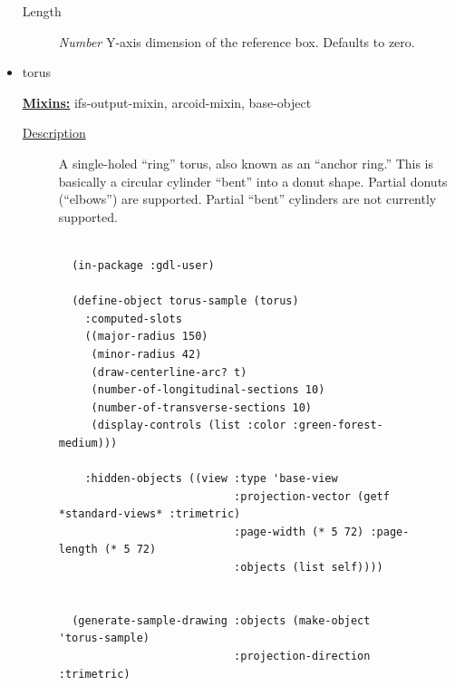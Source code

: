 \documentclass [11pt]{book}
\begin{document}
\begin{itemize}
\begin{description}

\item [Length]
\emph{Number} Y-axis dimension of the reference box. Defaults to zero.


\end{description}







\item {}torus


\textbf{
\underline{Mixins:}} ifs-output-mixin, arcoid-mixin, base-object





\begin{description}

\item [
\underline{Description}]


A single-holed ``ring'' torus, also known as an ``anchor ring.''
This is basically a circular cylinder ``bent'' into a donut shape. Partial donuts (``elbows'') are supported.
Partial ``bent'' cylinders are not currently supported.



\end{description}




\begin{figure}
\begin{lrbox}{\boxedverb}
\begin{minipage}{\linewidth}
{\small

\begin{verbatim}
  
  (in-package :gdl-user)
  
  (define-object torus-sample (torus)
    :computed-slots
    ((major-radius 150)
     (minor-radius 42)
     (draw-centerline-arc? t)
     (number-of-longitudinal-sections 10)
     (number-of-transverse-sections 10)
     (display-controls (list :color :green-forest-medium)))

    :hidden-objects ((view :type 'base-view
                           :projection-vector (getf *standard-views* :trimetric)
                           :page-width (* 5 72) :page-length (* 5 72)
                           :objects (list self))))
  

  (generate-sample-drawing :objects (make-object 'torus-sample) 
                           :projection-direction :trimetric)
                  


\end{verbatim}}
\end{minipage}
\end{lrbox}
\end{figure}
\end{itemize}
\end{document}
